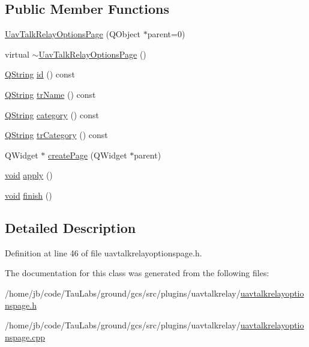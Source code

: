 \subsection*{\-Public \-Member \-Functions}
\begin{DoxyCompactItemize}
\item 
\hyperlink{group___u_a_v_talk_gac97773c8e2650a9c89d3b44262b3c9a5}{\-Uav\-Talk\-Relay\-Options\-Page} (\-Q\-Object $\ast$parent=0)
\item 
virtual \hyperlink{group___u_a_v_talk_gab4a5b0b63eba0e6df8f5d81ab10f5fff}{$\sim$\-Uav\-Talk\-Relay\-Options\-Page} ()
\item 
\hyperlink{group___u_a_v_objects_plugin_gab9d252f49c333c94a72f97ce3105a32d}{\-Q\-String} \hyperlink{group___u_a_v_talk_ga1a7f2a6d7fe0eab1466ad5fef1d77448}{id} () const 
\item 
\hyperlink{group___u_a_v_objects_plugin_gab9d252f49c333c94a72f97ce3105a32d}{\-Q\-String} \hyperlink{group___u_a_v_talk_gaa9de5e7b246a6ed8f405cd79586bcbab}{tr\-Name} () const 
\item 
\hyperlink{group___u_a_v_objects_plugin_gab9d252f49c333c94a72f97ce3105a32d}{\-Q\-String} \hyperlink{group___u_a_v_talk_ga096c5d44abc589317aae875f985190ed}{category} () const 
\item 
\hyperlink{group___u_a_v_objects_plugin_gab9d252f49c333c94a72f97ce3105a32d}{\-Q\-String} \hyperlink{group___u_a_v_talk_ga06b96ea896336a6b5cbf6431a19b60f7}{tr\-Category} () const 
\item 
\-Q\-Widget $\ast$ \hyperlink{group___u_a_v_talk_ga07ae0ea88536d2fd82f9f9ddb84cb3cc}{create\-Page} (\-Q\-Widget $\ast$parent)
\item 
\hyperlink{group___u_a_v_objects_plugin_ga444cf2ff3f0ecbe028adce838d373f5c}{void} \hyperlink{group___u_a_v_talk_gac14cce3fcdf4dc493bfc8777032d1b41}{apply} ()
\item 
\hyperlink{group___u_a_v_objects_plugin_ga444cf2ff3f0ecbe028adce838d373f5c}{void} \hyperlink{group___u_a_v_talk_ga3c6b3400f3c46755bcc572ba5b76e9af}{finish} ()
\end{DoxyCompactItemize}


\subsection{\-Detailed \-Description}


\-Definition at line 46 of file uavtalkrelayoptionspage.\-h.



\-The documentation for this class was generated from the following files\-:\begin{DoxyCompactItemize}
\item 
/home/jb/code/\-Tau\-Labs/ground/gcs/src/plugins/uavtalkrelay/\hyperlink{uavtalkrelayoptionspage_8h}{uavtalkrelayoptionspage.\-h}\item 
/home/jb/code/\-Tau\-Labs/ground/gcs/src/plugins/uavtalkrelay/\hyperlink{uavtalkrelayoptionspage_8cpp}{uavtalkrelayoptionspage.\-cpp}\end{DoxyCompactItemize}
